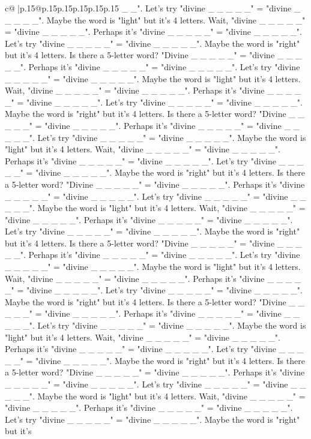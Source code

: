 \documentclass{article}
\begin{document}
{\begin{supertabular}{c@{$\;$}|p{.15\linewidth}@{}p{.15\linewidth}p{.15\linewidth}p{.15\linewidth}p{.15\linewidth}p{.15\linewidth}}
{{{\_ \_". Let's try "divine \_ \_ \_ \_ \_" = "divine \_ \_ \_ \_ \_". Maybe the word is "light" but it's 4 letters. Wait, "divine \_ \_ \_ \_ \_" = "divine \_ \_ \_ \_ \_". Perhaps it's "divine \_ \_ \_ \_ \_" = "divine \_ \_ \_ \_ \_". Let's try "divine \_ \_ \_ \_ \_" = "divine \_ \_ \_ \_ \_". Maybe the word is "right" but it's 4 letters. Is there a 5{-}letter word? "Divine \_ \_ \_ \_ \_" = "divine \_ \_ \_ \_ \_". Perhaps it's "divine \_ \_ \_ \_ \_" = "divine \_ \_ \_ \_ \_". Let's try "divine \_ \_ \_ \_ \_" = "divine \_ \_ \_ \_ \_". Maybe the word is "light" but it's 4 letters. Wait, "divine \_ \_ \_ \_ \_" = "divine \_ \_ \_ \_ \_". Perhaps it's "divine \_ \_ \_ \_ \_" = "divine \_ \_ \_ \_ \_". Let's try "divine \_ \_ \_ \_ \_" = "divine \_ \_ \_ \_ \_". Maybe the word is "right" but it's 4 letters. Is there a 5{-}letter word? "Divine \_ \_ \_ \_ \_" = "divine \_ \_ \_ \_ \_". Perhaps it's "divine \_ \_ \_ \_ \_" = "divine \_ \_ \_ \_ \_". Let's try "divine \_ \_ \_ \_ \_" = "divine \_ \_ \_ \_ \_". Maybe the word is "light" but it's 4 letters. Wait, "divine \_ \_ \_ \_ \_" = "divine \_ \_ \_ \_ \_". Perhaps it's "divine \_ \_ \_ \_ \_" = "divine \_ \_ \_ \_ \_". Let's try "divine \_ \_ \_ \_ \_" = "divine \_ \_ \_ \_ \_". Maybe the word is "right" but it's 4 letters. Is there a 5{-}letter word? "Divine \_ \_ \_ \_ \_" = "divine \_ \_ \_ \_ \_". Perhaps it's "divine \_ \_ \_ \_ \_" = "divine \_ \_ \_ \_ \_". Let's try "divine \_ \_ \_ \_ \_" = "divine \_ \_ \_ \_ \_". Maybe the word is "light" but it's 4 letters. Wait, "divine \_ \_ \_ \_ \_" = "divine \_ \_ \_ \_ \_". Perhaps it's "divine \_ \_ \_ \_ \_" = "divine \_ \_ \_ \_ \_". Let's try "divine \_ \_ \_ \_ \_" = "divine \_ \_ \_ \_ \_". Maybe the word is "right" but it's 4 letters. Is there a 5{-}letter word? "Divine \_ \_ \_ \_ \_" = "divine \_ \_ \_ \_ \_". Perhaps it's "divine \_ \_ \_ \_ \_" = "divine \_ \_ \_ \_ \_". Let's try "divine \_ \_ \_ \_ \_" = "divine \_ \_ \_ \_ \_". Maybe the word is "light" but it's 4 letters. Wait, "divine \_ \_ \_ \_ \_" = "divine \_ \_ \_ \_ \_". Perhaps it's "divine \_ \_ \_ \_ \_" = "divine \_ \_ \_ \_ \_". Let's try "divine \_ \_ \_ \_ \_" = "divine \_ \_ \_ \_ \_". Maybe the word is "right" but it's 4 letters. Is there a 5{-}letter word? "Divine \_ \_ \_ \_ \_" = "divine \_ \_ \_ \_ \_". Perhaps it's "divine \_ \_ \_ \_ \_" = "divine \_ \_ \_ \_ \_". Let's try "divine \_ \_ \_ \_ \_" = "divine \_ \_ \_ \_ \_". Maybe the word is "light" but it's 4 letters. Wait, "divine \_ \_ \_ \_ \_" = "divine \_ \_ \_ \_ \_". Perhaps it's "divine \_ \_ \_ \_ \_" = "divine \_ \_ \_ \_ \_". Let's try "divine \_ \_ \_ \_ \_" = "divine \_ \_ \_ \_ \_". Maybe the word is "right" but it's 4 letters. Is there a 5{-}letter word? "Divine \_ \_ \_ \_ \_" = "divine \_ \_ \_ \_ \_". Perhaps it's "divine \_ \_ \_ \_ \_" = "divine \_ \_ \_ \_ \_". Let's try "divine \_ \_ \_ \_ \_" = "divine \_ \_ \_ \_ \_". Maybe the word is "light" but it's 4 letters. Wait, "divine \_ \_ \_ \_ \_" = "divine \_ \_ \_ \_ \_". Perhaps it's "divine \_ \_ \_ \_ \_" = "divine \_ \_ \_ \_ \_". Let's try "divine \_ \_ \_ \_ \_" = "divine \_ \_ \_ \_ \_". Maybe the word is "right" but it's }}}
\end{supertabular}}
\end{document}
